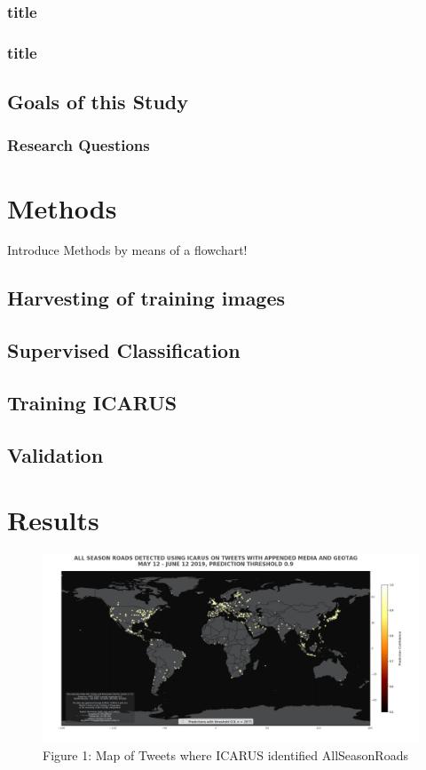 \documentclass[12pt]{scrartcl}
\begin{document}
			\subsubsection{title}
			
			\subsubsection{title}
			
			
			
		\subsection{Goals of this Study}
			\subsubsection{Research Questions}

		

		

	
	\newpage
	\section{Methods}
	Introduce Methods by means of a flowchart!
		\subsection{Harvesting of training images}
		\subsection{Supervised Classification}
		\subsection{Training ICARUS}
		\subsection{Validation}
	
	\newpage
	\section{Results}
		\begin{figure}[h]
			\centering
			\includegraphics[scale=0.3]{images/map_ICARUS_thresh90}
			\caption{Figure 1: Map of Tweets where ICARUS identified AllSeasonRoads}
			\label{fig: 1}
		\end{figure}
	
\end{document}
